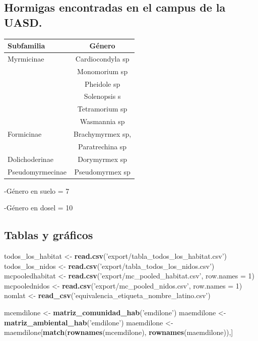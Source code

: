 \documentclass[11pt,]{article}
\newenvironment{Shaded}{\begin{snugshade}}{\end{snugshade}}
\newcommand{\KeywordTok}[1]{\textcolor[rgb]{0.13,0.29,0.53}{\textbf{#1}}}
\newcommand{\DataTypeTok}[1]{\textcolor[rgb]{0.13,0.29,0.53}{#1}}
\newcommand{\DecValTok}[1]{\textcolor[rgb]{0.00,0.00,0.81}{#1}}
\newcommand{\StringTok}[1]{\textcolor[rgb]{0.31,0.60,0.02}{#1}}
\newcommand{\NormalTok}[1]{#1}
\begin{document}
\subsection{Hormigas encontradas en el campus de la
UASD.}\label{hormigas-encontradas-en-el-campus-de-la-uasd.}

\begin{longtable}[]{@{}lc@{}}
\toprule
Subfamilia & Género\tabularnewline
\midrule
\endhead
Myrmicinae & Cardiocondyla sp\tabularnewline
& Monomorium sp\tabularnewline
& Pheidole sp\tabularnewline
& Solenopsis s\tabularnewline
& Tetramorium sp\tabularnewline
& Wasmannia sp\tabularnewline
Formicinae & Brachymyrmex sp,\tabularnewline
& Paratrechina sp\tabularnewline
Dolichoderinae & Dorymyrmex sp\tabularnewline
Pseudomyrmecinae & Pseudomyrmex sp\tabularnewline
\bottomrule
\end{longtable}

-Género en suelo = 7

-Género en dosel = 10

\subsection{Tablas y gráficos}\label{tablas-y-gruxe1ficos}

\begin{Shaded}
\begin{Highlighting}[]
\NormalTok{todos_los_habitat <-}\StringTok{ }\KeywordTok{read.csv}\NormalTok{(}\StringTok{'export/tabla_todos_los_habitat.csv'}\NormalTok{)}
\NormalTok{todos_los_nidos <-}\StringTok{ }\KeywordTok{read.csv}\NormalTok{(}\StringTok{'export/tabla_todos_los_nidos.csv'}\NormalTok{)}
\NormalTok{mcpooledhabitat <-}\StringTok{ }\KeywordTok{read.csv}\NormalTok{(}\StringTok{'export/mc_pooled_habitat.csv'}\NormalTok{, }\DataTypeTok{row.names =} \DecValTok{1}\NormalTok{)}
\NormalTok{mcpoolednidos <-}\StringTok{ }\KeywordTok{read.csv}\NormalTok{(}\StringTok{'export/mc_pooled_nidos.csv'}\NormalTok{, }\DataTypeTok{row.names =} \DecValTok{1}\NormalTok{)}
\NormalTok{nomlat <-}\StringTok{ }\KeywordTok{read_csv}\NormalTok{(}\StringTok{'equivalencia_etiqueta_nombre_latino.csv'}\NormalTok{)}
\end{Highlighting}
\end{Shaded}

\begin{Shaded}
\begin{Highlighting}[]
\NormalTok{mcemdilone <-}\StringTok{ }\KeywordTok{matriz_comunidad_hab}\NormalTok{(}\StringTok{'emdilone'}\NormalTok{)}
\NormalTok{maemdilone <-}\StringTok{ }\KeywordTok{matriz_ambiental_hab}\NormalTok{(}\StringTok{'emdilone'}\NormalTok{)}
\NormalTok{maemdilone <-}\StringTok{ }\NormalTok{maemdilone[}\KeywordTok{match}\NormalTok{(}\KeywordTok{rownames}\NormalTok{(mcemdilone), }\KeywordTok{rownames}\NormalTok{(maemdilone)),]}
\end{Highlighting}
\end{Shaded}
\end{document}
